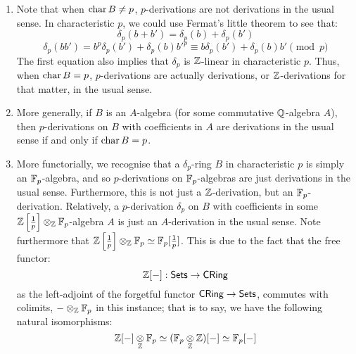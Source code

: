                     \begin{remark} \label{remark: arithmetic_and_algebraic_derivations}
                        \noindent
                        \begin{enumerate}
                            \item Note that when $\operatorname{char} B \not = p$, $p$-derivations are not derivations in the usual sense. In characteristic $p$, we could use Fermat's little theorem to see that:
                            $$\delta_p(b + b') = \delta_p(b) + \delta_p(b')$$
                            $$\delta_p(bb') = b^p\delta_p(b') + \delta_p(b)b'^p \equiv b\delta_p(b') + \delta_p(b)b' \pmod{p}$$
                            The first equation also implies that $\delta_p$ is $\mathbb{Z}$-linear in characteristic $p$. Thus, when $\operatorname{char} B = p$, $p$-derivations are actually derivations, or $\mathbb{Z}$-derivations for that matter, in the usual sense.
                            \item More generally, if $B$ is an $A$-algebra (for some commutative $\mathbb{Q}$-algebra $A$), then $p$-derivations on $B$ with coefficients in $A$ are derivations in the usual sense if and only if $\operatorname{char} B = p$.
                            \item More functorially, we recognise that a $\delta_p$-ring $B$ in characteristic $p$ is simply an $\mathbb{F}_p$-algebra, and so $p$-derivations on $\mathbb{F}_p$-algebras are just derivations in the usual sense. Furthermore, this is not just a $\mathbb{Z}$-derivation, but an $\mathbb{F}_p$-derivation. Relatively, a $p$-derivation $\delta_p$ on $B$ with coefficients in some $\Z\left[\frac1p\right] \tensor_{\Z} \F_p$-algebra $A$ is just an $A$-derivation in the usual sense. Note furthermore that $\Z\left[\frac1p\right] \tensor_{\Z} \F_p \cong \F_p[\frac1p]$. This is due to the fact that the free functor:
                                $$\mathbb{Z}[-]: \mathsf{Sets} \to \mathsf{CRing}$$
                            as the left-adjoint of the forgetful functor $\mathsf{CRing} \to \mathsf{Sets}$, commutes with colimits, $-\tensor_{\Z} \F_p$ in this instance; that is to say, we have the following natural isomorphisms:
                                $$\Z[-] \tensor_{\Z} \F_p \cong (\F_p \tensor_{\Z} \Z)[-] \cong \F_p[-]$$
                        \end{enumerate}
                    \end{remark}
